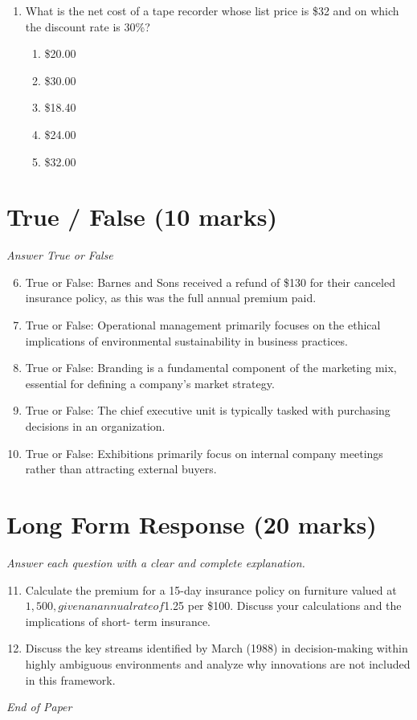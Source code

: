\documentclass[12pt]{article}
\begin{document}
\begin{enumerate}[label=\arabic*.]
\begin{enumerate}[label=(\alph*)]
    \item 370 kilos
    \item 380 kilos
    \item 345 kilos
    \item 375 kilos
    \item 400 kilos
\end{enumerate}
\item What is the net cost of a tape recorder whose list price is \$32 and on which the discount rate is 30\%?
\begin{enumerate}[label=(\alph*)]
    \item \$20.00
    \item \$30.00
    \item \$18.40
    \item \$24.00
    \item \$32.00
\end{enumerate}
\end{enumerate}

\section*{True / False (10 marks)}
\textit{Answer True or False}
\begin{enumerate}[label=\arabic*.]
\setcounter{enumi}{5}
\item True or False: Barnes and Sons received a refund of \$130 for their canceled insurance policy, as this was the full annual premium paid.
\item True or False: Operational management primarily focuses on the ethical implications of environmental sustainability in business practices.
\item True or False: Branding is a fundamental component of the marketing mix, essential for defining a company's market strategy.
\item True or False: The chief executive unit is typically tasked with purchasing decisions in an organization.
\item True or False: Exhibitions primarily focus on internal company meetings rather than attracting external buyers.
\end{enumerate}

\section*{Long Form Response (20 marks)}
\textit{Answer each question with a clear and complete explanation.}
\begin{enumerate}[label=\arabic*.]
\setcounter{enumi}{10}
\item Calculate the premium for a 15-day insurance policy on furniture valued at $1,500, given an annual rate of $1.25 per \$100. Discuss your calculations and the implications of short- term insurance.
\item Discuss the key streams identified by March (1988) in decision-making within highly ambiguous environments and analyze why innovations are not included in this framework.
\end{enumerate}

\vfill
\noindent\textit{End of Paper}
\end{document}
